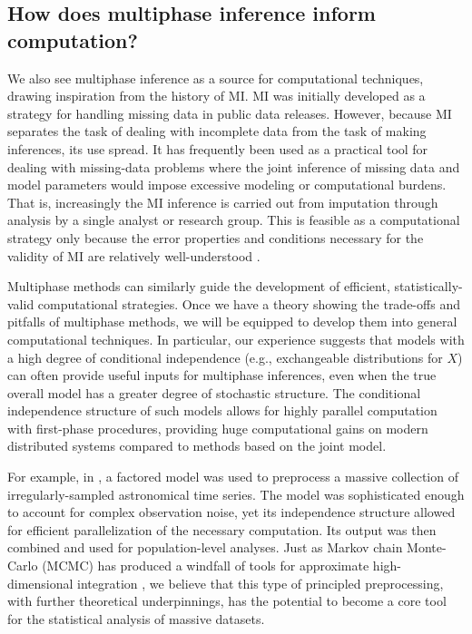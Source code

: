 \subsection{How does multiphase inference inform computation?}
\label{multiphase:sec:computation}

We also see multiphase inference as a source for computational techniques, drawing inspiration from the history of MI.
MI was initially developed  as a strategy for handling missing data in public data releases.
However, because MI separates the task of dealing with incomplete data from the task of making inferences, its use spread.
It has frequently been used as a practical tool for dealing with missing-data problems where the joint inference of missing data and model parameters would impose excessive modeling or  computational burdens.
That is, increasingly the MI inference is carried out from imputation through analysis by a single analyst or research group.
This is feasible as a computational strategy only because the error properties and conditions necessary for the validity of MI are relatively well-understood \citep[e.g.,][]{Meng1994,Xie2012}.

Multiphase methods can similarly guide the development of efficient, statistically-valid computational strategies.
Once we have a theory showing the trade-offs and pitfalls of multiphase methods, we will be equipped to develop them into general computational techniques.
In particular, our experience suggests that models with a high degree of conditional independence (e.g., exchangeable distributions for $X$) can often provide useful inputs for multiphase inferences, even when the true overall model has a greater degree of stochastic structure.
The conditional independence structure of such models allows for highly parallel computation with first-phase procedures, providing huge computational gains on modern distributed systems compared to methods based on the  joint model.

For example, in \citet{Blocker2012}, a factored model was used to preprocess a massive collection of irregularly-sampled astronomical time series.
The model was sophisticated enough to account for complex observation noise, yet its independence structure allowed for efficient parallelization of the necessary computation.
Its output was then combined and used for population-level analyses.
Just as Markov chain Monte-Carlo (MCMC) has produced a windfall of tools for approximate high-dimensional integration \citep[see][for many examples]{Brooks2010}, we believe that this type of principled preprocessing, with further theoretical underpinnings, has the potential to become a core tool for the statistical analysis of massive datasets.

